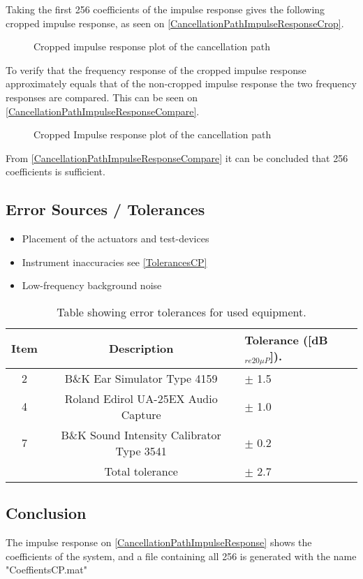 Taking the first 256 coefficients of the impulse response gives the following cropped impulse response, as seen on \autoref{CancellationPathImpulseResponseCrop}.

\begin{figure}[H]
	\centering
	
	\caption{Cropped impulse response plot of the cancellation path}
	\label{CancellationPathImpulseResponseCrop}
\end{figure}
To verify that the frequency response of the cropped impulse response approximately equals that of the non-cropped impulse response the two frequency responses are compared. This can be seen on \autoref{CancellationPathImpulseResponseCompare}.

\begin{figure}[H]
	\centering
	
	\caption{Cropped Impulse response plot of the cancellation path}
	\label{CancellationPathImpulseResponseCompare}
\end{figure}

From \autoref{CancellationPathImpulseResponseCompare} it can be concluded that 256 coefficients is sufficient. 

\subsection{Error Sources / Tolerances}
\begin{itemize}
	\item Placement of the actuators and test-devices
	\item Instrument inaccuracies see \autoref{TolerancesCP}
	\item Low-frequency background noise
\end{itemize}

\begin{table}[h]
	\centering
	\begin{tabular}{ c c l } \toprule
		{Item}	& 		{Description} 	& {Tolerance ([dB$_{re20\mu P}$])}.	 \\ \bottomrule 
		2	&	B\&K Ear Simulator Type 4159				& $\pm$ 1.5 	\\
		4	&	Roland Edirol UA-25EX Audio Capture			& $\pm$ 1.0	\\
		7	&	B\&K Sound Intensity Calibrator Type 3541	& $\pm$ 0.2	\\ \bottomrule
			&	Total tolerance								& $\pm$ 2.7	\\ \bottomrule	
	\end{tabular}
	\caption{Table showing error tolerances for used equipment.}
	\label{TolerancesCP}
\end{table}

\subsection{Conclusion}
The impulse response on \autoref{CancellationPathImpulseResponse} shows the coefficients of the system, and a file containing all 256 is generated with the name "CoeffientsCP.mat"